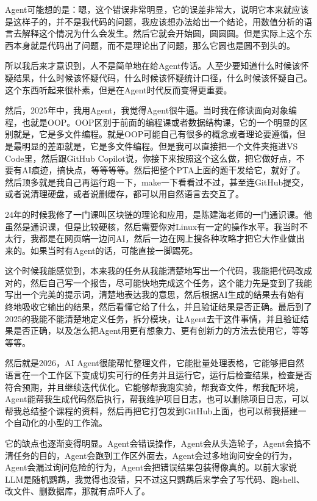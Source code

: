 Agent可能想的是：嗯，这个错误非常明显，它的误差非常大，说明它本来就应该是这样子的，并不是我代码的问题，我应该想办法给出一个结论，用数值分析的语言去解释这个情况为什么会发生。然后它就会开始圆，圆圆圆。但是实际上这个东西本身就是代码出了问题，而不是理论出了问题，那么它圆也是圆不到头的。

所以我后来才意识到，人不是简单地在给Agent传话。人至少要知道什么时候该怀疑结果，什么时候该怀疑代码，什么时候该怀疑统计口径，什么时候该怀疑自己。这个东西听起来很朴素，但是在Agent时代反而变得更重要。

然后，2025年中，我用Agent，我觉得Agent很牛逼。当时我在修读面向对象编程，也就是OOP。OOP区别于前面的编程课或者数据结构课，它的一个明显的区别就是，它是多文件编程。就是OOP可能自己有很多的概念或者理论要遵循，但是最明显的差距就是，它是多文件编程。但是我可以直接把一个文件夹拖进VS Code里，然后跟GitHub Copilot说，你接下来按照这个这么做，把它做好点，不要有AI痕迹，搞快点，等等等等。然后把整个PTA上面的题干发给它，就好了。然后顶多就是我自己再运行跑一下，make一下看看过不过，甚至连GitHub提交，或者说清理硬盘，或者说删缓存，都可以用自然语言去交互了。

24年的时候我修了一门课叫区块链的理论和应用，是陈建海老师的一门通识课。他虽然是通识课，但是比较硬核，然后需要你对Linux有一定的操作水平。我当时不太行，我都是在网页端一边问AI，然后一边在网上搜各种攻略才把它大作业做出来的。如果当时有Agent的话，可能直接一脚踢死。

这个时候我能感觉到，本来我的任务从我能清楚地写出一个代码，我能把代码改成对的，然后自己写一个报告，尽可能快地完成这个任务，这个能力先是变到了我能写出一个完美的提示词，清楚地表达我的意思，然后根据AI生成的结果去有始有终地吸收它输出的结果，然后看懂它给了什么，并且验证结果是否正确。最后到了2025的我能不能清楚地定义任务，拆分模块，让Agent去干这件事情，并且验证结果是否正确，以及怎么把Agent用更有想象力、更有创新力的方法去使用它，等等等等。

然后就是2026，AI Agent很能帮忙整理文件，它能批量处理表格，它能够把自然语言在一个工作区下变成切实可行的任务并且运行它，运行后检查结果，检查是否符合预期，并且继续迭代优化。它能够帮我跑实验，帮我查文件，帮我配环境，Agent能帮我生成代码然后执行，帮我维护项目日志，也可以删除项目日志，可以帮我总结整个课程的资料，然后再把它打包发到GitHub上面，也可以帮我搭建一个自动化的小型的工作流。

它的缺点也逐渐变得明显。Agent会错误操作，Agent会从头造轮子，Agent会搞不清任务的目的，Agent会跑到工作区外面去，Agent会过多地询问安全的行为，Agent会漏过询问危险的行为，Agent会把错误结果包装得像真的。以前大家说LLM是随机鹦鹉，我觉得也没错，只不过这只鹦鹉后来学会了写代码、跑shell、改文件、删数据库，那就有点吓人了。


